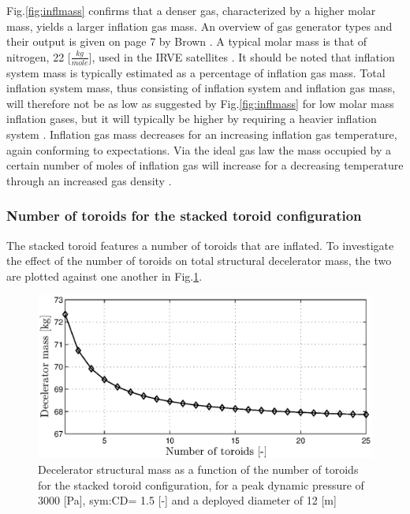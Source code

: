 Fig.\ref{fig:inflmass} confirms that a denser gas, characterized by a higher molar mass, yields a larger inflation gas mass. An overview of gas generator types and their output is given on page 7 by Brown \cite{Brown2003}. A typical molar mass is that of nitrogen, 22 [$\frac{kg}{mole}$], used in the IRVE satellites \cite{Dillman2012}. It should be noted that inflation system mass is typically estimated as a percentage of inflation gas mass. Total inflation system mass, thus consisting of inflation system and inflation gas mass, will therefore not be as low as suggested by Fig.\ref{fig:inflmass} for low molar mass inflation gases, but it will typically be higher by requiring a heavier inflation system \cite{Brown2003}. Inflation gas mass decreases for an increasing inflation gas temperature, again conforming to expectations. Via the ideal gas law the mass occupied by a certain number of moles of inflation gas will increase for a decreasing temperature through an increased gas density \cite{AndersonJr.2007}.

\subsubsection{Number of toroids for the stacked toroid configuration}
The stacked toroid features a number of toroids that are inflated. To investigate the effect of the number of toroids on total structural decelerator mass, the two are plotted against one another in Fig.\ref{fig:toro}. 

\begin{figure}[H]
\centering
\includegraphics[width = 1.0\textwidth]{Figure/mass_toroids.eps}
\caption{Decelerator structural mass as a function of the number of toroids for the stacked toroid configuration, for a peak dynamic pressure of 3000 [Pa], \gls{sym:CD}= 1.5 [-] and a deployed diameter of 12 [m]}
\label{fig:toro}
\end{figure}

